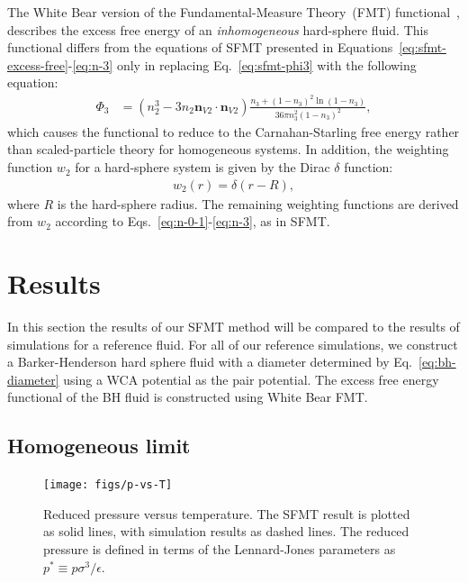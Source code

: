 \documentclass[letterpaper,twocolumn,amsmath,amssymb,prb]{revtex4-1}
\begin{document}
The White Bear version of the Fundamental-Measure Theory~(FMT)
functional~\cite{roth2002whitebear}, \color{red}describes the excess free energy
of an \emph{inhomogeneous} hard-sphere fluid.  This functional differs
from the equations of SFMT presented in
Equations~\ref{eq:sfmt-excess-free}-\ref{eq:n-3} only in replacing
Eq.~\ref{eq:sfmt-phi3} with the following equation:
\begin{align}
\Phi_3 &= (n_2^3 - 3 n_2 \mathbf{n}_{V2} \cdot \mathbf{n}_{V2}) \frac{
  n_3 + (1-n_3)^2 \ln(1-n_3)
}{
  36\pi n_3^2\left( 1 - n_3 \right)^2
} ,
\end{align}
which causes the functional to reduce to the Carnahan-Starling free
energy rather than scaled-particle theory for homogeneous systems. \color{black} In
addition, the weighting function $w_2$ for a hard-sphere system is
given by the Dirac $\delta$ function:
\begin{align}
  w_2(r) = \delta(r - R),
\end{align}
where $R$ is the hard-sphere radius.  The remaining weighting
functions are derived from $w_2$ according to
Eqs.~\ref{eq:n-0-1}-\ref{eq:n-3}, as in SFMT.






\section{Results}
In this section the results of our SFMT method will be compared to the results of simulations for a reference fluid.
For all of our reference simulations, we construct a Barker-Henderson hard
sphere fluid with a diameter determined by Eq.~\ref{eq:bh-diameter}
using a WCA potential as the pair potential. The excess free energy functional of the 
BH fluid is constructed using White Bear FMT. %

\subsection{Homogeneous limit}

\begin{figure}
\begin{center}
\texttt{[image: figs/p-vs-T]}
\end{center}
\caption{Reduced pressure versus temperature.  The SFMT result is
  plotted as solid lines, with simulation results as dashed lines.
  The reduced pressure is defined in terms of the Lennard-Jones
  parameters as $p^{*} \equiv p \sigma^3/\epsilon$.}
\label{fig:p-vs-T}
\end{figure}
\end{document}

